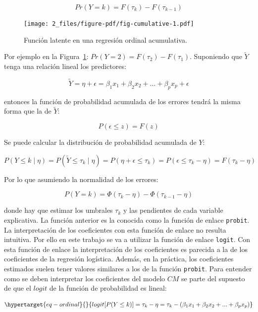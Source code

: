\documentclass[
  12pt,
  a4paper,
  extrafontsizes,
  onecolumn,
  openright,
  table]{memoir}
\begin{document}
\[Pr(Y = k) = F(\tau_k) - F(\tau_{k-1})\]

\begin{figure}[h]

{\centering \texttt{[image: 2\_files/figure-pdf/fig-cumulative-1.pdf]}

}

\caption{\label{fig-cumulative}Función latente en una regresión ordinal
acumulativa.}

\end{figure}

Por ejemplo en la Figura~\ref{fig-cumulative}:
\(Pr(Y = 2) = F(\tau_2) - F(\tau_{1})\). Suponiendo que \(\tilde{Y}\)
tenga una relación lineal los predictores:

\[\tilde{Y} = \eta + \epsilon = \beta_1 x_1 + \beta_2 x_2 + ... + \beta_p x_p + \epsilon\]

entonces la función de probabilidad acumulada de los errores tendrá la
misma forma que la de \(\tilde{Y}\):

\[P(\epsilon \leq z) = F(z)\]

Se puede calcular la distribución de probabilidad acumulada de \(Y\):

\[P(Y \leq k \mid \eta) = P(\tilde{Y} \leq \tau_k \mid \eta) = P(\eta + \epsilon \leq \tau_k) = P(\epsilon \leq \tau_k - \eta) = F(\tau_k - \eta)\]

Por lo que asumiendo la normalidad de los errores:

\[P(Y = k) = \Phi(\tau_k - \eta) - \Phi(\tau_{k - 1} - \eta)\]

donde hay que estimar los umbrales \(\tau_k\) y las pendientes de cada
variable explicativa. La función anterior es la conocida como la función
de enlace \texttt{probit}. La interpretación de los coeficientes con
esta función de enlace no resulta intuitiva. Por ello en este trabajo se
va a utilizar la función de enlace \texttt{logit}. Con esta función de
enlace la interpretación de los coeficientes es parecida a la de los
coeficientes de la regresión logística. Además, en la práctica, los
coeficientes estimados suelen tener valores similares a los de la
función \texttt{probit}. Para entender como se deben interpretar los
coeficientes del modelo \(CM\) se parte del supuesto de que el \(logit\)
de la función de probabilidad es lineal:

\begin{equation}\protect\hypertarget{eq-ordinal}{}{
logit [P(Y \le k)] = \tau_{k} - \eta = \tau_{k} - (\beta_1 x_1 + \beta_2 x_2 + ... + \beta_p x_p)
}\label{eq-ordinal}\end{equation}
\end{document}
